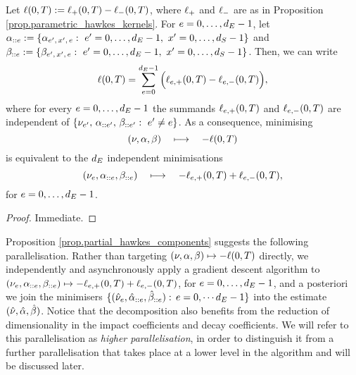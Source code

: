 \documentclass[10pt, article,table]{article}
\begin{document}
\begin{prop}\label{prop.partial_hawkes_components}
 Let $\ell(0,T):= \ell_{+}(0,T) - \ell_{-}(0,T)$, where $\ell_{+}$ and $\ell_{-}$ are as in Proposition \ref{prop.parametric_hawkes_kernels}. For $e=0,\dots,d_{E}-1$, let  $\alpha_{::e} := \lbrace \alpha_{e^{\prime},\, x^{\prime},\, e}: \, \, e^{\prime} = 0,\dots, d_{E}-1 , \, \, x^{\prime}=0,\dots,d_{S}-1\rbrace$ and $\beta_{::e} := \lbrace \beta_{e^{\prime},\, x^{\prime},\, e}: \, \, e^{\prime} = 0,\dots, d_{E}-1 , \, \, x^{\prime}=0,\dots,d_{S}-1\rbrace$. Then, we can write 
 \begin{equation*}
  \ell(0,T)
  =
  \sum_{e=0}^{d_{E}-1}
  \Big(
  \ell_{e,+}(0,T) - \ell_{e,-}(0,T)
  \Big),
 \end{equation*}
where for every $e=0,\dots, d_{E}-1$ the summands $\ell_{e,+}(0,T)$ and $\ell_{e,-}(0,T)$ are independent of $\lbrace \nu_{e^{\prime}}, \, \alpha_{::e^{\prime}} , \, \beta_{::e^{\prime}} : \, \, e^{\prime} \ne e\rbrace$. As a consequence, minimising 
\begin{equation*}
 (\nu,\alpha,\beta) \quad \longmapsto \quad 
- \ell(0,T)
\end{equation*}
is equivalent to the $d_{E}$ independent minimisations
\begin{equation*}
 (\nu_e,\alpha_{::e},\beta_{::e}) \quad \longmapsto \quad 
 -\ell_{e,+}(0,T) + \ell_{e,-}(0,T),
\end{equation*}
for $e=0,\dots,d_{E}-1$.
\end{prop}
\begin{proof}
 Immediate. 
\end{proof}

Proposition \ref{prop.partial_hawkes_components} suggests the following parallelisation. Rather than targeting  $(\nu,\alpha,\beta) \mapsto -\ell(0,T)$ directly, we independently and asynchronously apply a gradient descent algorithm to $(\nu_e,\alpha_{::e},\beta_{::e}) \mapsto  
 -\ell_{e,+}(0,T) + \ell_{e,-}(0,T)$, for $e=0,\dots,d_{E}-1$, and a posteriori we join the minimisers $\lbrace(\hat{\nu}_e,\hat{\alpha}_{::e},\hat{\beta}_{::e}): \, e=0,\dotsm d_{E} -1 \rbrace $ into the estimate $(\hat{\nu},\hat{\alpha},\hat{\beta})$. Notice that the decomposition also benefits from the reduction of dimensionality in the impact coefficients and decay coefficients. We will refer to this parallelisation as \emph{higher parallelisation}, in order to distinguish it from a further parallelisation that takes place at a lower level in the algorithm and will be discussed later.
 
\end{document}
